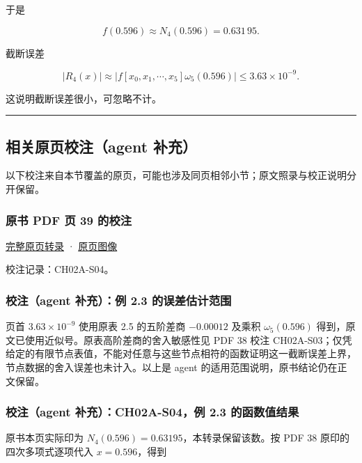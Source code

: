 \documentclass[
  10pt,
  fontset=fandol]{ctexart}
\begin{document}
于是

\[
f(0.596)\approx N_4(0.596)=0.631\,95.
\]

截断误差

\[
|R_4(x)|\approx|f[x_0,x_1,\cdots,x_5]\omega_5(0.596)|\le3.63\times10^{-9}.
\]

这说明截断误差很小，可忽略不计。

\begin{center}\rule{0.5\linewidth}{0.5pt}\end{center}

\subsection{相关原页校注（agent 补充）}\label{ux76f8ux5173ux539fux9875ux6821ux6ce8agent-ux8865ux5145}

以下校注来自本节覆盖的原页，可能也涉及同页相邻小节；原文照录与校正说明分开保留。

\subsubsection{原书 PDF 页 39 的校注}\label{ux539fux4e66-pdf-ux9875-39-ux7684ux6821ux6ce8}

\href{../pages/pdf-039.md}{完整原页转录} · \href{../../source-images/pdf-039.jpeg}{原页图像}

校注记录：CH02A-S04。

\subsubsection{校注（agent 补充）：例 2.3 的误差估计范围}\label{ux6821ux6ce8agent-ux8865ux5145ux4f8b-2.3-ux7684ux8befux5deeux4f30ux8ba1ux8303ux56f4}

页首 \(3.63\times10^{-9}\) 使用原表 2.5 的五阶差商 \(-0.00012\) 及乘积 \(\omega_5(0.596)\) 得到，原文已使用近似号。原表高阶差商的舍入敏感性见 PDF 38 校注 CH02A-S03；仅凭给定的有限节点表值，不能对任意与这些节点相符的函数证明这一截断误差上界，节点数据的舍入误差也未计入。以上是 agent 的适用范围说明，原书结论仍在正文保留。

\subsubsection{校注（agent 补充）：CH02A-S04，例 2.3 的函数值结果}\label{ux6821ux6ce8agent-ux8865ux5145ch02a-s04ux4f8b-2.3-ux7684ux51fdux6570ux503cux7ed3ux679c}

原书本页实际印为 \(N_4(0.596)=0.63195\)，本转录保留该数。按 PDF 38 原印的四次多项式逐项代入 \(x=0.596\)，得到
\end{document}
